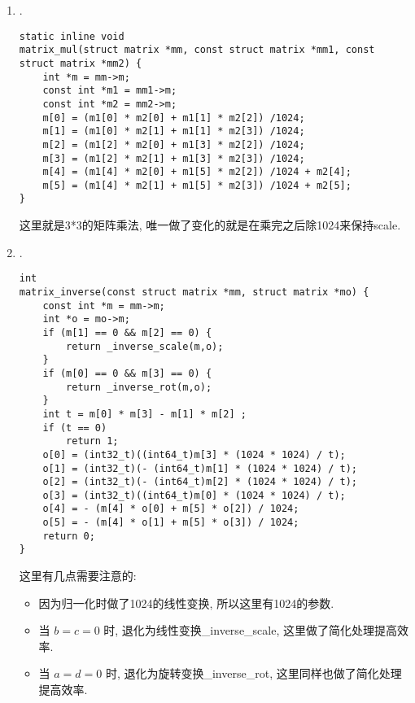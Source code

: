 {\begin {enumerate}
    \item { {}.
        \begin{lstlisting}[language={[ANSI]C}]
static inline void
matrix_mul(struct matrix *mm, const struct matrix *mm1, const struct matrix *mm2) {
    int *m = mm->m;
    const int *m1 = mm1->m;
    const int *m2 = mm2->m;
    m[0] = (m1[0] * m2[0] + m1[1] * m2[2]) /1024;
    m[1] = (m1[0] * m2[1] + m1[1] * m2[3]) /1024;
    m[2] = (m1[2] * m2[0] + m1[3] * m2[2]) /1024;
    m[3] = (m1[2] * m2[1] + m1[3] * m2[3]) /1024;
    m[4] = (m1[4] * m2[0] + m1[5] * m2[2]) /1024 + m2[4];
    m[5] = (m1[4] * m2[1] + m1[5] * m2[3]) /1024 + m2[5];
}
        \end{lstlisting}
        这里就是3*3的矩阵乘法, 唯一做了变化的就是在乘完之后除1024来保持scale.
    }

    \gaccobsplitinv

    \item { {}.
        \begin{lstlisting}[language={[ANSI]C}]
int
matrix_inverse(const struct matrix *mm, struct matrix *mo) {
    const int *m = mm->m;
    int *o = mo->m;
    if (m[1] == 0 && m[2] == 0) {
        return _inverse_scale(m,o);
    }
    if (m[0] == 0 && m[3] == 0) {
        return _inverse_rot(m,o);
    }
    int t = m[0] * m[3] - m[1] * m[2] ;
    if (t == 0)
        return 1;
    o[0] = (int32_t)((int64_t)m[3] * (1024 * 1024) / t);
    o[1] = (int32_t)(- (int64_t)m[1] * (1024 * 1024) / t);
    o[2] = (int32_t)(- (int64_t)m[2] * (1024 * 1024) / t);
    o[3] = (int32_t)((int64_t)m[0] * (1024 * 1024) / t);
    o[4] = - (m[4] * o[0] + m[5] * o[2]) / 1024;
    o[5] = - (m[4] * o[1] + m[5] * o[3]) / 1024;
    return 0;
}
        \end{lstlisting}
        这里有几点需要注意的:
        \begin{itemize}
        \item { 因为归一化时做了1024的线性变换, 所以这里有1024的参数.}
        \item { 当 $b = c = 0$ 时, 退化为线性变换\_inverse\_scale, 这里做了简化处理提高效率. }
        \item { 当 $a = d = 0$ 时, 退化为旋转变换\_inverse\_rot, 这里同样也做了简化处理提高效率. }
        \end{itemize}
    }

    \gaccobsplitinv


\end{enumerate}}
